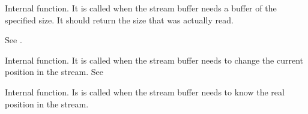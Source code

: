\label{wxstreambaseonsysread}


Internal function. It is called when the stream buffer needs a buffer of the
specified size. It should return the size that was actually read.



See .



Internal function. It is called when the stream buffer needs to change the
current position in the stream. See 



Internal function. Is is called when the stream buffer needs to know the
real position in the stream.

